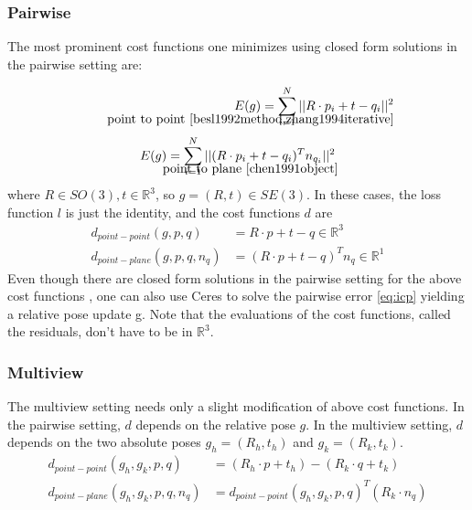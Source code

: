 \documentclass[12pt, a4paper]{article}
\newcommand{\eqname}[1]{\\[-\baselineskip] \tag*{#1}}%
\begin{document}
\subsubsection{Pairwise}
The most prominent cost functions one minimizes using closed form solutions in the pairwise setting are:

\begin{align}
E(g) = \sum_{i=1}^N || R \cdot p_i + t - q_i ||^2 \label{eq:pointToPoint} \eqname{point to point \cite{besl1992method,zhang1994iterative}} \label{eqname:pointToPoint}
\end{align}
\begin{gather}
E(g) = \sum_{i=1}^N || (R \cdot p_i + t - q_i)^T n_{q_i} || ^2 \label{eq:pointToPlane} 
\eqname{point to plane \cite{chen1991object}} \label{eqname:pointToPlane}
\end{gather}
where $R \in SO(3), t \in \mathbb{R}^3$, so $g=(R,t) \in SE(3)$. In these cases, the loss function $l$ is just the identity, and the cost functions $d$ are
\begin{align}
	d_{point-point}(g,p,q) & = R \cdot p + t - q  \in \mathbb{R}^3 \label{dist:pointToPoint} \\
	d_{point-plane}(g,p,q,n_q) & = (R \cdot p + t - q)^T n_q \in \mathbb{R}^1 \label{dist:pointToPlane}
\end{align}
Even though there are closed form solutions in the pairwise setting for the above cost functions \cite{eggert1997estimating,low2004linear}, one can also use Ceres to solve the pairwise error \eqref{eq:icp} yielding a relative pose update g. Note that the evaluations of the cost functions, called the residuals, don't have to be in $\mathbb{R}^3$.

\subsubsection{Multiview}
The multiview setting needs only a slight modification of above cost functions. In the pairwise setting, $d$ depends on the relative pose $g$. In the multiview setting, $d$ depends on the two absolute poses $g_h=(R_h,t_h)$ and $g_k=(R_k,t_k)$. 
\begin{align}
	d_{point-point}(g_h,g_k,p,q) & = (R_h \cdot p + t_h ) - (R_k \cdot q + t_k )  \label{dist:pointToPointGlobal} \\
	d_{point-plane}(g_h,g_k,p,q,n_q) & = d_{point-point}(g_h,g_k,p,q)^T ( R_k \cdot n_q)  \label{dist:pointToPlaneGlobal}
\end{align}
\end{document}
